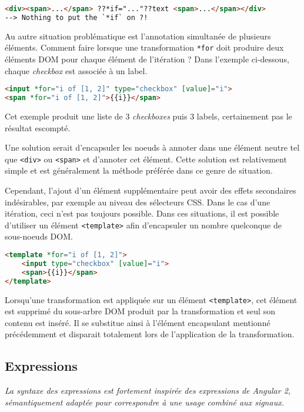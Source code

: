 \begin{lstlisting}[language=HTML]
<div><span>...</span> ??*if="..."??text <span>...</span></div>
--> Nothing to put the `*if` on ?!
\end{lstlisting}

Au autre situation problématique est l'annotation simultanée de plusieurs éléments. Comment faire lorsque une transformation \texttt{*for} doit produire deux éléments DOM pour chaque élément de l'itération ? Dans l'exemple ci-dessous, chaque \emph{checkbox} est associée à un label.

\begin{lstlisting}[language=HTML]
<input *for="i of [1, 2]" type="checkbox" [value]="i">
<span *for="i of [1, 2]">{{i}}</span>
\end{lstlisting}

Cet exemple produit une liste de 3 \emph{checkboxes} puis 3 labels, certainement pas le résultat escompté.

Une solution serait d'encapsuler les noeuds à annoter dans une élément neutre tel que \texttt{<div>} ou \texttt{<span>} et d'annoter cet élément. Cette solution est relativement simple et est généralement la méthode préférée dans ce genre de situation.

Cependant, l'ajout d'un élément supplémentaire peut avoir des effets secondaires indésirables, par exemple au niveau des sélecteurs CSS. Dans le cas d'une itération, ceci n'est pas toujours possible. Dans ces situations, il est possible d'utiliser un élément \texttt{<template>} afin d'encapsuler un nombre quelconque de sous-noeuds DOM.

\begin{lstlisting}[language=HTML]
<template *for="i of [1, 2]">
	<input type="checkbox" [value]="i">
	<span>{{i}}</span>
</template>
\end{lstlisting}

Lorsqu'une transformation est appliquée sur un élément \texttt{<template>}, cet élément est supprimé du sous-arbre DOM produit par la transformation et seul son contenu est inséré. Il se substitue ainsi à l'élément encapsulant mentionné précédemment et disparait totalement lors de l'application de la transformation.

\subsection{Expressions} \label{sec:web-usage-expr}
\textit{La syntaxe des expressions est fortement inspirée des expressions de Angular 2, sémantiquement adaptée pour correspondre à une usage combiné aux signaux.}

